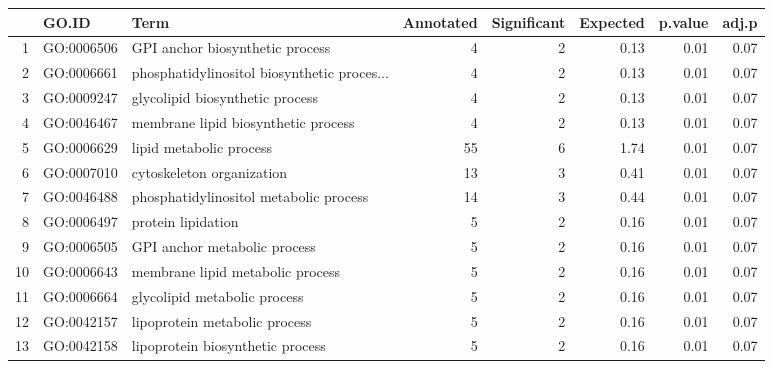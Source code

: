 \begin{table}[ht]
\centering
\begin{tabular}{rllrrrrr}
  \hline
 & GO.ID & Term & Annotated & Significant & Expected & p.value & adj.p \\ 
  \hline
1 & GO:0006506 & GPI anchor biosynthetic process &   4 &   2 & 0.13 & 0.01 & 0.07 \\ 
  2 & GO:0006661 & phosphatidylinositol biosynthetic proces... &   4 &   2 & 0.13 & 0.01 & 0.07 \\ 
  3 & GO:0009247 & glycolipid biosynthetic process &   4 &   2 & 0.13 & 0.01 & 0.07 \\ 
  4 & GO:0046467 & membrane lipid biosynthetic process &   4 &   2 & 0.13 & 0.01 & 0.07 \\ 
  5 & GO:0006629 & lipid metabolic process &  55 &   6 & 1.74 & 0.01 & 0.07 \\ 
  6 & GO:0007010 & cytoskeleton organization &  13 &   3 & 0.41 & 0.01 & 0.07 \\ 
  7 & GO:0046488 & phosphatidylinositol metabolic process &  14 &   3 & 0.44 & 0.01 & 0.07 \\ 
  8 & GO:0006497 & protein lipidation &   5 &   2 & 0.16 & 0.01 & 0.07 \\ 
  9 & GO:0006505 & GPI anchor metabolic process &   5 &   2 & 0.16 & 0.01 & 0.07 \\ 
  10 & GO:0006643 & membrane lipid metabolic process &   5 &   2 & 0.16 & 0.01 & 0.07 \\ 
  11 & GO:0006664 & glycolipid metabolic process &   5 &   2 & 0.16 & 0.01 & 0.07 \\ 
  12 & GO:0042157 & lipoprotein metabolic process &   5 &   2 & 0.16 & 0.01 & 0.07 \\ 
  13 & GO:0042158 & lipoprotein biosynthetic process &   5 &   2 & 0.16 & 0.01 & 0.07 \\ 
   \hline
\end{tabular}
\end{table}

